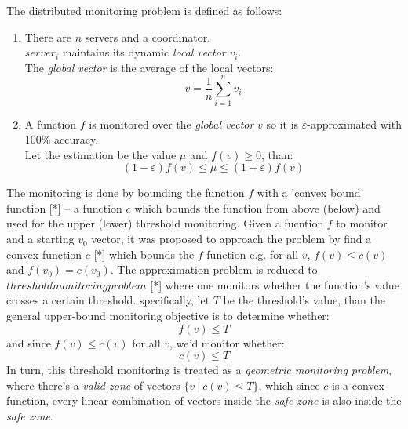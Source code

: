 \documentclass[10pt, conference]{IEEEtran}
\begin{document}
The distributed monitoring problem is defined as follows:
\begin{enumerate}
\item There are $n$ servers and a coordinator. \\ $server_i$ maintains its dynamic \textit{local vector} $v_i$. \\ The \textit{global vector} is the average of the local vectors: $$v = \frac{1}{n}\sum\limits_{i=1}^n {v_i}$$
\item A function $f$ is monitored over the \textit{global vector} $v$ so it is $\varepsilon$-approximated with 100\% accuracy. \\ Let the estimation  be the value $\mu$ and $f(v) \geq 0$, than: $$(1-\varepsilon )f(v) \leq \mu \leq (1+\varepsilon )f(v)$$
\end{enumerate}
The monitoring is done by bounding the function $f$ with a 'convex bound' function [*] -- a function $c$ which bounds the function from above (below) and used for the upper (lower) threshold monitoring.
Given a fucntion $f$ to monitor and a starting $v_0$ vector, it was proposed to approach the problem by find a convex function $c$ \label{fConvexity} [*] which bounds the $f$ function e.g. for all $v$, $f(v) \leq c(v)$ and $f(v_0)=c(v_0)$. The approximation problem is reduced to $threshold monitoring problem$ [*] where one monitors whether the function's value crosses a certain threshold. specifically, let $T$ be the threshold's value, than the general upper-bound monitoring objective is to determine whether:
\begin{equation}
\label{functionMonitoringConstraint}
f(v) \leq T
\end{equation}
and since $f(v) \leq c(v)$ for all $v$, we'd monitor whether:
\begin{equation}
\label{monitoringConstraint}
c(v) \leq T
\end{equation}
In turn, this threshold monitoring is treated as a \textit{geometric monitoring problem}, where there's a \textit{valid zone} of vectors $\{v \ | \ c(v) \leq T\}$, which since $c$ is a convex function, every linear combination of vectors inside the \textit{safe zone} is also inside the \textit{safe zone}. 
\end{document}
